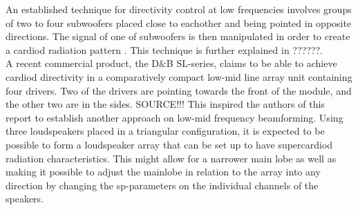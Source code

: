 An established technique for directivity control at low frequencies involves groups of two to four subwoofers placed close to eachother and being pointed in opposite directions. The signal of one of subwoofers is then manipulated in order to create a cardiod radiation pattern \citep{KS28}. This technique is further explained in ??????.\\
A recent commercial product, the D\&B SL-series, claims to be able to achieve cardiod directivity in a comparatively compact low-mid line array unit containing four drivers. Two of the drivers are pointing towards the front of the module, and the other two are in the sides. SOURCE!!! This inspired the authors of this report to establish another approach on low-mid frequency beamforming. Using three loudspeakers placed in a triangular configuration, it is expected to be possible to form a loudspeaker array that can be set up to have supercardiod radiation characteristics. This might allow for a narrower main lobe as well as making it possible to adjust the mainlobe in relation to the array into any direction by changing the \gls{sp}-parameters on the individual channels of the speakers.






